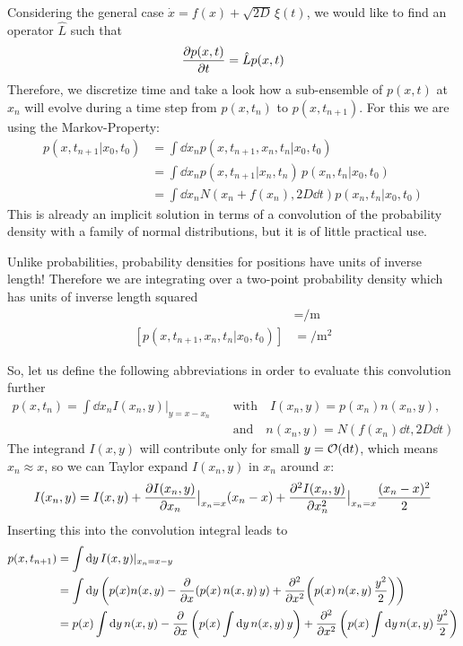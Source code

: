 \documentclass{/home/ben/Templates/notebook}
\begin{document}
	Considering the general case $\dot{x} = f(x) + \sqrt{2D} \, \xi(t)$, we would like to find an operator $\hat{L}$ such that
	\begin{equation}
	\pdv{p(x,t)}{t} = \hat{L} p(x,t)
	\end{equation}
	Therefore, we discretize time and take a look how a sub-ensemble of $p(x,t)$ at $x_n$ will evolve during a time step from $p(x,t_n)$ to $p(x,t_{n+1})$. For this we are using the Markov-Property: 
	\begin{align*}
		p(x,t_{n+1}|x_0,t_0) &= \int{\dd{x}_n p(x,t_{n+1},x_n,t_n|x_0,t_0)} \\
		&= \int{\dd{x}_n p(x,t_{n+1}|x_n,t_n)} \, p(x_n,t_n|x_0,t_0) \\
		&= \int{\dd{x}_n N(x_n+f(x_n), 2D \dd{t}) p(x_n,t_n|x_0,t_0)}
	\end{align*}
	This is already an implicit solution in terms of a convolution of the probability density with a family of normal distributions, but it is of little practical use. 
	\begin{remark}
		Unlike probabilities, probability densities for positions have units of inverse length! Therefore we are integrating over a two-point probability density which has units of inverse length squared
		\begin{align*}
			[p(x,t_{n+1}|x_0,t_0)] &= \si{\per \meter} \\
			[p(x,t_{n+1},x_n,t_n|x_0,t_0)] &= \si{\per \meter \squared}
		\end{align*}
	\end{remark}
	So, let us define the following abbreviations in order to evaluate this convolution further 
	\begin{align*}
		p(x,t_n) = \int \dd x_n I(x_n, y) |_{y = x-x_n} \quad &\mathrm{with} \quad I(x_n,y) = p(x_n) n(x_n,y), \\ 
		&\mathrm{and} \quad n(x_n,y) = N(f(x_n) \dd t, 2 D \dd t)
	\end{align*}
	The integrand $I(x,y)$ will contribute only for small $y = \mathcal{O}(\dd t)$, which means $x_n \approx x$, so we can Taylor expand $I(x_n,y)$ in $x_n$ around $x$:
	\begin{equation}
	I(x_n,y) = I(x,y) + \pdv{I(x_n,y)}{x_n} \big|_{x_n = x} (x_n-x) + \pdv[2]{I(x_n,y)}{x_n} \big|_{x_n = x} \frac{(x_n-x)^2}{2}
	\end{equation}
	Inserting this into the convolution integral leads to
	\begin{align*}
		p(x,t_{n+1}) &= \int{\dd{y} I(x,y)|_{x_n = x-y}} \\
		&= \int\dd y \left( p(x) n(x,y) - \pdv{x} (p(x) \, n(x,y) \, y ) + \pdv[2]{x} (p(x) \, n(x,y) \, \frac{y^2}{2})\right) \\
		&= p(x) \int \dd{y} n(x,y) - \pdv{x} \left(p(x) \int \dd{y} n(x,y) \, y \right) + \pdv[2]{x} \left(p(x) \int \dd{y} n(x,y) \, \frac{y^2}{2} \right)
	\end{align*}
\end{document}
